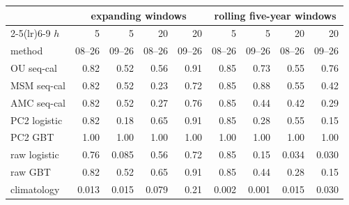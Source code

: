 \begin{tabular}{lrrrrrrrr}\toprule
 & \multicolumn{4}{c}{expanding windows} & \multicolumn{4}{c}{rolling five-year windows}\\
\cmidrule(lr){2-5}\cmidrule(lr){6-9} $h$ & 5 & 5 & 20 & 20 & 5 & 5 & 20 & 20\\
method & 08--26 & 09--26 & 08--26 & 09--26 & 08--26 & 09--26 & 08--26 & 09--26\\\midrule
OU seq-cal & 0.82 & 0.52 & 0.56 & 0.91 & 0.85 & 0.73 & 0.55 & 0.76\\
MSM seq-cal & 0.82 & 0.52 & 0.23 & 0.72 & 0.85 & 0.88 & 0.55 & 0.42\\
AMC seq-cal & 0.82 & 0.52 & 0.27 & 0.76 & 0.85 & 0.44 & 0.42 & 0.29\\
PC2 logistic & 0.82 & 0.18 & 0.65 & 0.91 & 0.85 & 0.28 & 0.55 & 0.15\\
PC2 GBT & 1.00 & 1.00 & 1.00 & 1.00 & 1.00 & 1.00 & 1.00 & 1.00\\
raw logistic & 0.76 & 0.085 & 0.56 & 0.72 & 0.85 & 0.15 & 0.034 & 0.030\\
raw GBT & 0.82 & 0.52 & 0.65 & 0.91 & 0.85 & 0.44 & 0.28 & 0.15\\
climatology & 0.013 & 0.015 & 0.079 & 0.21 & 0.002 & 0.001 & 0.015 & 0.030\\
\bottomrule\end{tabular}
